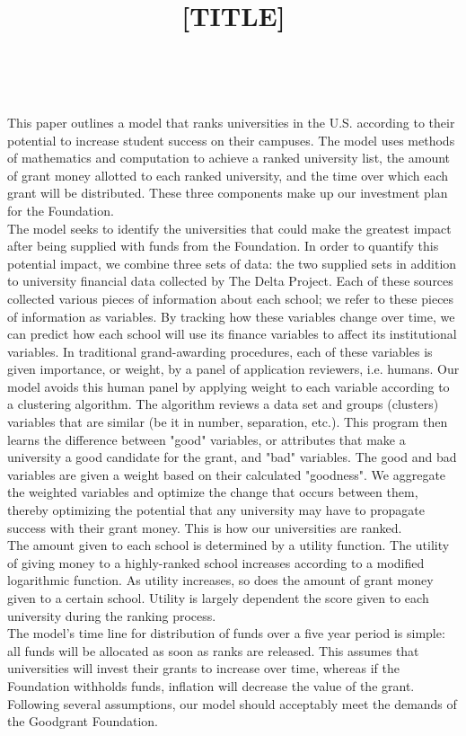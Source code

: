 \documentclass[11pt, reqno]{amsart}
\title{[TITLE]}
\begin{document}
	\thispagestyle{empty}
	
	\ \vspace{8.6cm}
	
	This paper outlines a model that ranks universities in the U.S. according to their potential to increase student success on their campuses. The model uses methods of mathematics and computation to achieve a ranked university list, the amount of grant money allotted to each ranked university, and the time over which each grant will be distributed. These three components make up our investment plan for the Foundation.
		\\     
		The model seeks to identify the universities that could make the greatest impact after being supplied with funds from the Foundation. In order to quantify this potential impact, we combine three sets of data: the two supplied sets in addition to university financial data collected by The Delta Project. Each of these sources collected various pieces of information about each school; we refer to these pieces of information as variables. By tracking how these variables change over time, we can predict how each school will use its finance variables to affect its institutional variables. In traditional grand-awarding procedures, each of these variables is given importance, or weight, by a panel of application reviewers, i.e. humans. Our model avoids this human panel by applying weight to each variable according to a clustering algorithm. The algorithm reviews a data set and groups (clusters) variables that are similar (be it in number, separation, etc.). This program then learns the difference between "good" variables, or attributes that make a university a good candidate for the grant, and "bad" variables. The good and bad variables are given a weight based on their calculated "goodness". We aggregate the weighted variables and optimize the change that occurs between them, thereby optimizing the potential that any university may have to propagate success with their grant money. This is how our universities are ranked.
		\\     
		The amount given to each school is determined by a utility function. The utility of giving money to a highly-ranked school increases according to a modified logarithmic function. As utility increases, so does the amount of grant money given to a certain school. Utility is largely dependent the score given to each university during the ranking process. 
		\\     
		The model's time line for distribution of funds over a five year period is simple: all funds will be allocated as soon as ranks are released. This assumes that universities will invest their grants to increase over time, whereas if the Foundation withholds funds, inflation will decrease the value of the grant. 
		\\     
		Following several assumptions, our model should acceptably meet the demands of the Goodgrant Foundation.
	
\end{document}
